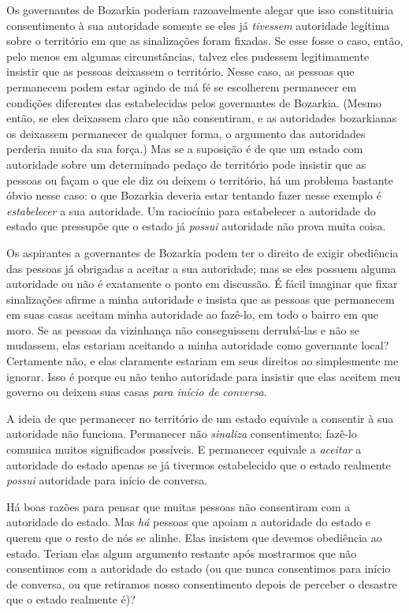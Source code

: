 Os governantes de Bozarkia poderiam razoavelmente alegar que isso constituiria consentimento à sua autoridade somente se eles já \emph{tivessem} autoridade legítima sobre o território em que as sinalizações foram fixadas. Se esse fosse o caso, então, pelo menos em algumas circunstâncias, talvez eles pudessem legitimamente insistir que as pessoas deixassem o território. Nesse caso, as pessoas que permanecem podem estar agindo de má fé se escolherem permanecer em condições diferentes das estabelecidas pelos governantes de Bozarkia. (Mesmo então, se eles deixassem claro que não consentiram, e as autoridades bozarkianas os deixassem permanecer de qualquer forma, o argumento das autoridades perderia muito da sua força.) Mas se a suposição é de que um estado com autoridade sobre um determinado pedaço de território pode insistir que as pessoas ou façam o que ele diz ou deixem o território, há um problema bastante óbvio nesse caso: o que Bozarkia deveria estar tentando fazer nesse exemplo é \emph{estabelecer} a sua autoridade. Um raciocínio para estabelecer a autoridade do estado que pressupõe que o estado já \emph{possui} autoridade não prova muita coisa.

Os aspirantes a governantes de Bozarkia podem ter o direito de exigir obediência das pessoas já obrigadas a aceitar a sua autoridade; mas se eles possuem alguma autoridade ou não é exatamente o ponto em discussão. É fácil imaginar que fixar sinalizações afirme a minha autoridade e insista que as pessoas que permanecem em suas casas aceitam minha autoridade ao fazê-lo, em todo o bairro em que moro. Se as pessoas da vizinhança não conseguissem derrubá-las e não se mudassem, elas estariam aceitando a minha autoridade como governante local? Certamente não, e elas claramente estariam em seus direitos ao simplesmente me ignorar. Isso é porque eu não tenho autoridade para insistir que elas aceitem meu governo ou deixem suas casas \emph{para início de conversa}.

A ideia de que permanecer no território de um estado equivale a consentir à sua autoridade não funciona. Permanecer não \emph{sinaliza} consentimento; fazê-lo comunica muitos significados possíveis. E permanecer equivale a \emph{aceitar} a autoridade do estado apenas se já tivermos estabelecido que o estado realmente \emph{possui} autoridade para início de conversa.

Há boas razões para pensar que muitas pessoas não consentiram com a autoridade do estado. Mas \emph{há} pessoas que apoiam a autoridade do estado e querem que o resto de nós se alinhe. Elas insistem que devemos obediência ao estado. Teriam elas algum argumento restante após mostrarmos que não consentimos com a autoridade do estado (ou que nunca consentimos para início de conversa, ou que retiramos nosso consentimento depois de perceber o desastre que o estado realmente é)?

